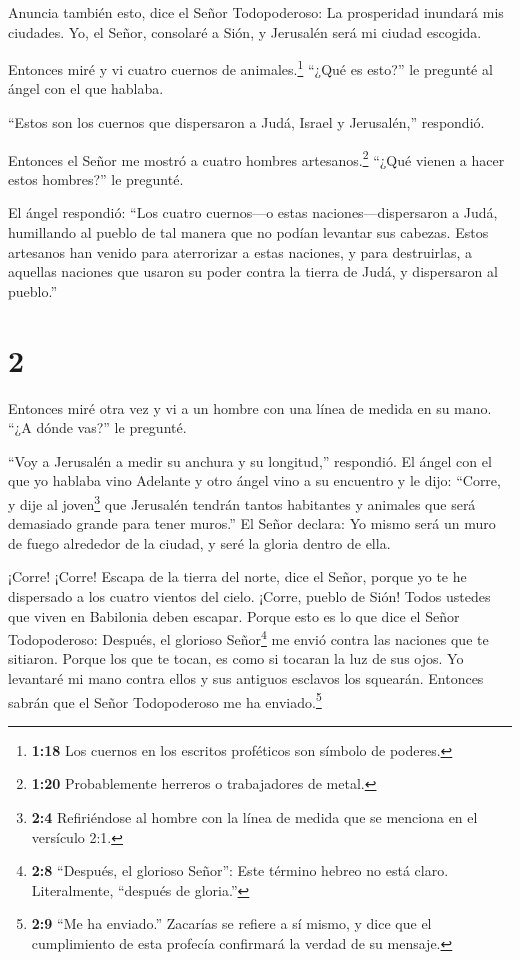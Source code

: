  Anuncia también esto, dice el Señor Todopoderoso: La
prosperidad inundará mis ciudades. Yo, el Señor, consolaré a Sión, y
Jerusalén será mi ciudad escogida.

 Entonces miré y vi cuatro cuernos de animales.\footnote{\textbf{1:18}
  Los cuernos en los escritos proféticos son símbolo de poderes.}
 ``¿Qué es esto?'' le pregunté al ángel con el que hablaba.

``Estos son los cuernos que dispersaron a Judá, Israel y Jerusalén,''
respondió.

 Entonces el Señor me mostró a cuatro hombres
artesanos.\footnote{\textbf{1:20} Probablemente herreros o trabajadores
  de metal.}  ``¿Qué vienen a hacer estos hombres?'' le
pregunté.

El ángel respondió: ``Los cuatro cuernos---o estas
naciones---dispersaron a Judá, humillando al pueblo de tal manera que no
podían levantar sus cabezas. Estos artesanos han venido para aterrorizar
a estas naciones, y para destruirlas, a aquellas naciones que usaron su
poder contra la tierra de Judá, y dispersaron al pueblo.''

\hypertarget{section-1}{%
\section{2}\label{section-1}}

 Entonces miré otra vez y vi a un hombre con una línea de
medida en su mano.  ``¿A dónde vas?'' le pregunté.

``Voy a Jerusalén a medir su anchura y su longitud,'' respondió.
 El ángel con el que yo hablaba vino Adelante y otro ángel
vino a su encuentro  y le dijo: ``Corre, y dije al
joven\footnote{\textbf{2:4} Refiriéndose al hombre con la línea de
  medida que se menciona en el versículo 2:1.} que Jerusalén tendrán
tantos habitantes y animales que será demasiado grande para tener
muros.''  El Señor declara: Yo mismo será un muro de fuego
alrededor de la ciudad, y seré la gloria dentro de ella.

 ¡Corre! ¡Corre! Escapa de la tierra del norte, dice el
Señor, porque yo te he dispersado a los cuatro vientos del cielo.
 ¡Corre, pueblo de Sión! Todos ustedes que viven en
Babilonia deben escapar.  Porque esto es lo que dice el
Señor Todopoderoso: Después, el glorioso Señor\footnote{\textbf{2:8}
  ``Después, el glorioso Señor'': Este término hebreo no está claro.
  Literalmente, ``después de gloria.''} me envió contra las naciones que
te sitiaron. Porque los que te tocan, es como si tocaran la luz de sus
ojos.  Yo levantaré mi mano contra ellos y sus antiguos
esclavos los squearán. Entonces sabrán que el Señor Todopoderoso me ha
enviado.\footnote{\textbf{2:9} ``Me ha enviado.'' Zacarías se refiere a
  sí mismo, y dice que el cumplimiento de esta profecía confirmará la
  verdad de su mensaje.}

